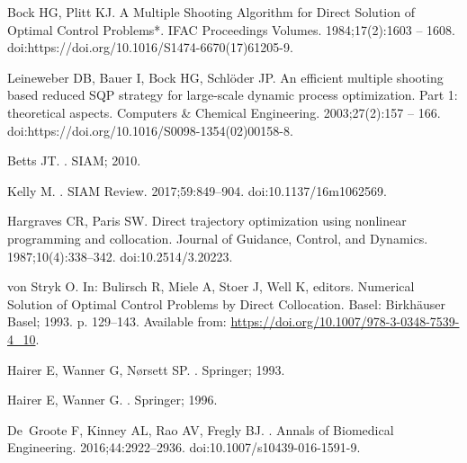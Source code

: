 \documentclass[10pt,letterpaper]{article}
\begin{document}
\begin{thebibliography}{10}
    Bock HG, Plitt KJ.
    \newblock A Multiple Shooting Algorithm for Direct Solution of Optimal Control
    Problems*.
    \newblock IFAC Proceedings Volumes. 1984;17(2):1603 -- 1608.
    \newblock doi:{https://doi.org/10.1016/S1474-6670(17)61205-9}.

    Leineweber DB, Bauer I, Bock HG, Schl{\"o}der JP.
    \newblock An efficient multiple shooting based reduced SQP strategy for
    large-scale dynamic process optimization. Part 1: theoretical aspects.
    \newblock Computers \& Chemical Engineering. 2003;27(2):157 -- 166.
    \newblock doi:{https://doi.org/10.1016/S0098-1354(02)00158-8}.

    Betts JT.
    .
    \newblock SIAM; 2010.

    Kelly M.
    .
    \newblock SIAM Review. 2017;59:849--904.
    \newblock doi:{10.1137/16m1062569}.

    Hargraves CR, Paris SW.
    \newblock Direct trajectory optimization using nonlinear programming and
    collocation.
    \newblock Journal of Guidance, Control, and Dynamics. 1987;10(4):338--342.
    \newblock doi:{10.2514/3.20223}.

    von Stryk O.
    \newblock In: Bulirsch R, Miele A, Stoer J, Well K, editors. Numerical Solution
    of Optimal Control Problems by Direct Collocation. Basel: Birkh{\"a}user
    Basel; 1993. p. 129--143.
    \newblock Available from: \url{https://doi.org/10.1007/978-3-0348-7539-4_10}.

    Hairer E, Wanner G, Nørsett SP.
    .
    \newblock Springer; 1993.

    Hairer E, Wanner G.
    .
    \newblock Springer; 1996.

    De~Groote F, Kinney AL, Rao AV, Fregly BJ.
    .
    \newblock Annals of Biomedical Engineering. 2016;44:2922--2936.
    \newblock doi:{10.1007/s10439-016-1591-9}.


\end{thebibliography}
\end{document}
